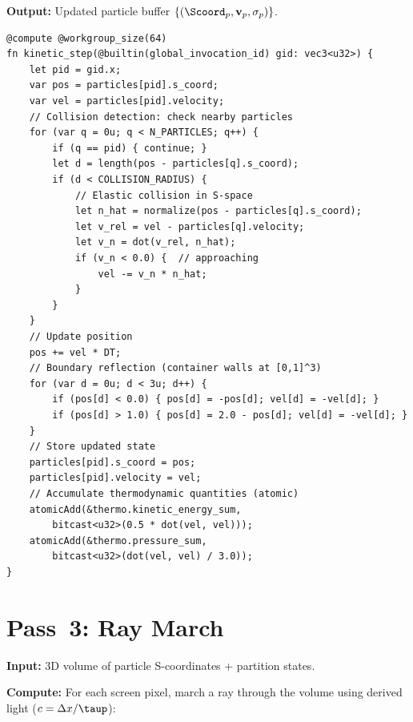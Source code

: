\textbf{Output:} Updated particle buffer $\{(\Scoord_p, \mathbf{v}_p, \sigma_p)\}$.

\begin{lstlisting}[style=wgsl,caption={Pass 2: Kinetic Integration (WGSL pseudocode)}]
@compute @workgroup_size(64)
fn kinetic_step(@builtin(global_invocation_id) gid: vec3<u32>) {
    let pid = gid.x;
    var pos = particles[pid].s_coord;
    var vel = particles[pid].velocity;
    // Collision detection: check nearby particles
    for (var q = 0u; q < N_PARTICLES; q++) {
        if (q == pid) { continue; }
        let d = length(pos - particles[q].s_coord);
        if (d < COLLISION_RADIUS) {
            // Elastic collision in S-space
            let n_hat = normalize(pos - particles[q].s_coord);
            let v_rel = vel - particles[q].velocity;
            let v_n = dot(v_rel, n_hat);
            if (v_n < 0.0) {  // approaching
                vel -= v_n * n_hat;
            }
        }
    }
    // Update position
    pos += vel * DT;
    // Boundary reflection (container walls at [0,1]^3)
    for (var d = 0u; d < 3u; d++) {
        if (pos[d] < 0.0) { pos[d] = -pos[d]; vel[d] = -vel[d]; }
        if (pos[d] > 1.0) { pos[d] = 2.0 - pos[d]; vel[d] = -vel[d]; }
    }
    // Store updated state
    particles[pid].s_coord = pos;
    particles[pid].velocity = vel;
    // Accumulate thermodynamic quantities (atomic)
    atomicAdd(&thermo.kinetic_energy_sum,
        bitcast<u32>(0.5 * dot(vel, vel)));
    atomicAdd(&thermo.pressure_sum,
        bitcast<u32>(dot(vel, vel) / 3.0));
}
\end{lstlisting}

\section{Pass~3: Ray March}
\label{sec:pass3}

\textbf{Input:} 3D volume of particle S-coordinates + partition states.

\textbf{Compute:} For each screen pixel, march a ray through the volume using derived light ($c = \Delta x/\taup$):

